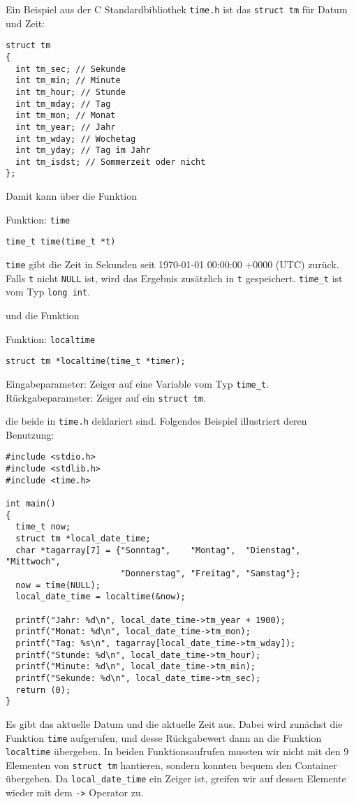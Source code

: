 Ein Beispiel aus der C Standardbibliothek \verb|time.h| ist das \verb|struct tm| für Datum und Zeit:
\begin{lstlisting}
struct tm
{
  int tm_sec; // Sekunde
  int tm_min; // Minute
  int tm_hour; // Stunde
  int tm_mday; // Tag
  int tm_mon; // Monat
  int tm_year; // Jahr
  int tm_wday; // Wochetag
  int tm_yday; // Tag im Jahr
  int tm_isdst; // Sommerzeit oder nicht
};
\end{lstlisting}
Damit kann über die Funktion
\begin{myexampleblock}{Funktion: \texttt{time}}
  \begin{lstlisting}
time_t time(time_t *t)
  \end{lstlisting}
  \vspace{-0.4cm}
  \verb|time| gibt die Zeit in Sekunden seit 1970-01-01 00:00:00 +0000 (UTC) zurück.
  Falls \verb|t| nicht \verb|NULL| ist, wird das Ergebnis zusätzlich in \verb|t| gespeichert.
  \verb|time_t| ist vom Typ \verb|long int|.
\end{myexampleblock}
und die Funktion
\begin{myexampleblock}{Funktion: \texttt{localtime}}
  \begin{lstlisting}
struct tm *localtime(time_t *timer);
  \end{lstlisting}
  \vspace{-0.4cm}
  Eingabeparameter: Zeiger auf eine Variable vom Typ \verb|time_t|.
  Rückgabeparameter: Zeiger auf ein \verb|struct tm|.
\end{myexampleblock}
die beide in \verb|time.h| deklariert sind.
Folgendes Beispiel illustriert deren Benutzung:
\begin{lstlisting}
#include <stdio.h>
#include <stdlib.h>
#include <time.h>

int main()
{
  time_t now;
  struct tm *local_date_time;
  char *tagarray[7] = {"Sonntag",    "Montag",  "Dienstag", "Mittwoch",
                       "Donnerstag", "Freitag", "Samstag"};
  now = time(NULL);
  local_date_time = localtime(&now);

  printf("Jahr: %d\n", local_date_time->tm_year + 1900);
  printf("Monat: %d\n", local_date_time->tm_mon);
  printf("Tag: %s\n", tagarray[local_date_time->tm_wday]);
  printf("Stunde: %d\n", local_date_time->tm_hour);
  printf("Minute: %d\n", local_date_time->tm_min);
  printf("Sekunde: %d\n", local_date_time->tm_sec);
  return (0);
}
\end{lstlisting}
Es gibt das aktuelle Datum und die aktuelle Zeit aus.
Dabei wird zunächst die Funktion \verb|time| aufgerufen, und desse Rückgabewert dann an die Funktion \verb|localtime| übergeben.
In beiden Funktionsaufrufen mussten wir nicht mit den $9$ Elementen von \verb|struct tm| hantieren, sondern konnten bequem den Container übergeben.
Da \verb|local_date_time| ein Zeiger ist, greifen wir auf dessen Elemente wieder mit dem \verb|->| Operator zu.
